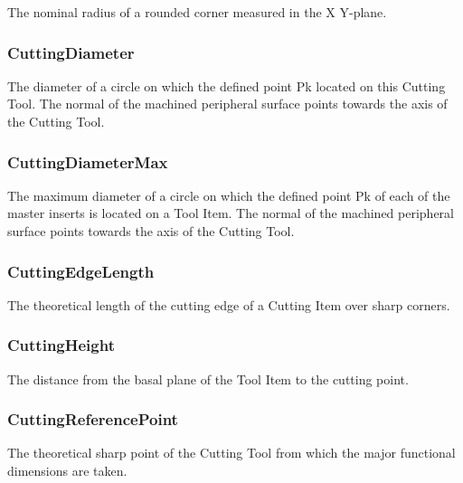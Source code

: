 The nominal radius of a rounded corner measured in the X Y-plane.



\subsubsection{CuttingDiameter}
\label{sec:CuttingDiameter}



The diameter of a circle on which the defined point Pk located on this Cutting Tool. The normal of the machined peripheral surface points towards the axis of the Cutting Tool.



\subsubsection{CuttingDiameterMax}
\label{sec:CuttingDiameterMax}



The maximum diameter of a circle on which the defined point Pk of each of the master inserts is located on a Tool Item. The normal of the machined peripheral surface points towards the axis of the Cutting Tool.



\subsubsection{CuttingEdgeLength}
\label{sec:CuttingEdgeLength}



The theoretical length of the cutting edge of a Cutting Item over sharp corners.



\subsubsection{CuttingHeight}
\label{sec:CuttingHeight}



The distance from the basal plane of the Tool Item to the cutting point.



\subsubsection{CuttingReferencePoint}
\label{sec:CuttingReferencePoint}



The theoretical sharp point of the Cutting Tool from which the major functional dimensions are taken.



